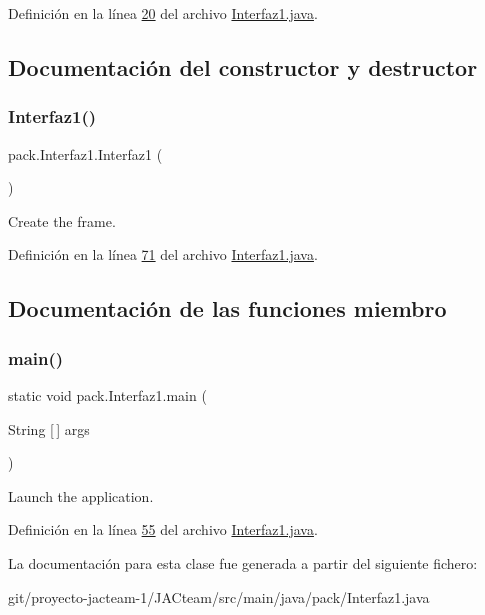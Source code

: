 Definición en la línea \mbox{\hyperlink{_interfaz1_8java_source_l00020}{20}} del archivo \mbox{\hyperlink{_interfaz1_8java_source}{Interfaz1.\+java}}.



\subsection{Documentación del constructor y destructor}
\mbox{\label{classpack_1_1_interfaz1_a1e7e3d091113cf6569221d4c5dad40bb}} 
\subsubsection{\texorpdfstring{Interfaz1()}{Interfaz1()}}
{\footnotesize\ttfamily pack.\+Interfaz1.\+Interfaz1 (\begin{DoxyParamCaption}{ }\end{DoxyParamCaption})}

Create the frame. 

Definición en la línea \mbox{\hyperlink{_interfaz1_8java_source_l00071}{71}} del archivo \mbox{\hyperlink{_interfaz1_8java_source}{Interfaz1.\+java}}.



\subsection{Documentación de las funciones miembro}
\mbox{\label{classpack_1_1_interfaz1_aa6a2189460a4c501ae7deabb5fd658c8}} 
\subsubsection{\texorpdfstring{main()}{main()}}
{\footnotesize\ttfamily static void pack.\+Interfaz1.\+main (\begin{DoxyParamCaption}\item[{String \mbox{[}$\,$\mbox{]}}]{args }\end{DoxyParamCaption})\hspace{0.3cm}{\ttfamily [static]}}

Launch the application. 

Definición en la línea \mbox{\hyperlink{_interfaz1_8java_source_l00055}{55}} del archivo \mbox{\hyperlink{_interfaz1_8java_source}{Interfaz1.\+java}}.



La documentación para esta clase fue generada a partir del siguiente fichero\+:\begin{DoxyCompactItemize}
\item 
git/proyecto-\/jacteam-\/1/\+J\+A\+Cteam/src/main/java/pack/Interfaz1.\+java\end{DoxyCompactItemize}
